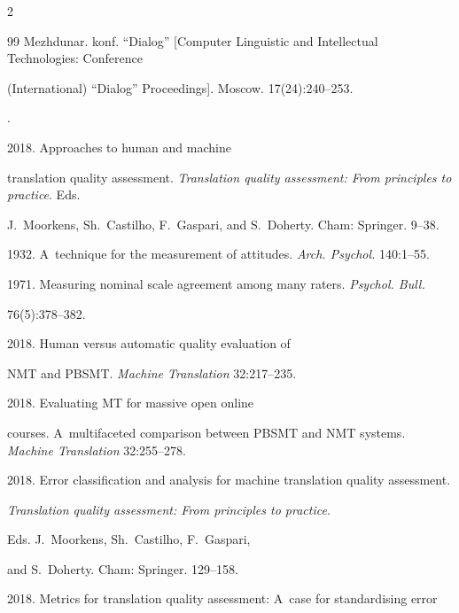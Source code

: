 \begin{multicols}{2}
{{\begin{thebibliography}{99}
{Mezhdunar. konf. ``Dialog''} [Computer Linguistic and Intellectual Technologies: Conference 


(International) ``Dialog'' Proceedings]. Moscow. 17(24):240--253.




.


 2018. Approaches to human and machine 


translation quality assessment. \textit{Translation quality assessment: From principles to practice}. Eds. 


J.~Moorkens, Sh.~Castilho, F.~Gaspari, and S.~Doherty. Cham: Springer. 9--38.




 1932. A~technique for the measurement of attitudes. \textit{Arch. Psychol.} 140:1--55.




 1971. Measuring nominal scale agreement among many raters. \textit{Psychol. Bull.} 


76(5):378--382.






 2018. Human versus automatic quality evaluation of 


NMT and PBSMT. \textit{Machine Translation} 32:217--235.




 2018. Evaluating MT for massive open online 


courses. A~multifaceted comparison between PBSMT and NMT systems. \textit{Machine Translation} 32:255--278.




 2018. Error classification and analysis for machine translation quality assessment. 


\textit{Translation quality assessment: From principles to practice}. 


Eds. J.~Moorkens, Sh.~Castilho, F.~Gaspari, 


and S.~Doherty. Cham: Springer. 129--158.




 2018. Metrics for translation quality assessment: A~case for standardising error 



\end{thebibliography}}}
\end{multicols}
